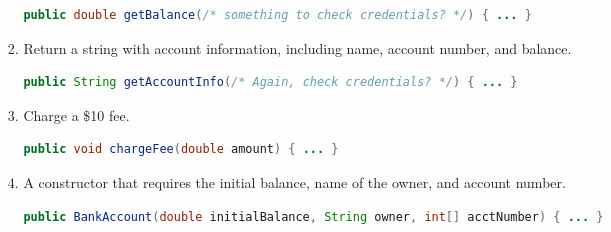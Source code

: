 \documentclass[leqno, 11pt]{article}
\begin{document}
\begin{enumerate}
\begin{enumerate}[label=\alph*.]
\begin{enumerate}[label=\roman*.]
\begin{lstlisting}[language=java, xleftmargin=0.06\textwidth, backgroundcolor=\color{white}]
public double getBalance(/* something to check credentials? */) { ... }
                        \end{lstlisting}
                  \item Return a string with account information, including name, account number, and balance.
                        \begin{lstlisting}[language=java, xleftmargin=0.05\textwidth, backgroundcolor=\color{white}]
public String getAccountInfo(/* Again, check credentials? */) { ... }
                        \end{lstlisting}
                  \item Charge a \$10 fee.
                        \begin{lstlisting}[language=java, xleftmargin=0.18\textwidth, backgroundcolor=\color{white}]
public void chargeFee(double amount) { ... }
                        \end{lstlisting}
                  \item A constructor that requires the initial balance, name of the owner, and account number.
                        \begin{lstlisting}[language=java, xleftmargin=0.01\textwidth, backgroundcolor=\color{white}]
public BankAccount(double initialBalance, String owner, int[] acctNumber) { ... }
                        \end{lstlisting}
                \end{enumerate}
        \end{enumerate}
\end{enumerate}
\end{document}
